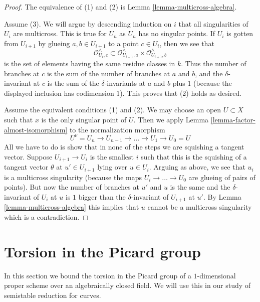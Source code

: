 \begin{proof}
The equivalence of (1) and (2) is Lemma \ref{lemma-multicross-algebra}.

\medskip\noindent
Assume (3). We will argue by descending induction on $i$ that all singularities
of $U_i$ are multicross. This is true for $U_n$ as $U_n$ has no singular points.
If $U_i$ is gotten from $U_{i + 1}$ by glueing $a, b \in U_{i + 1}$
to a point $c \in U_i$, then we see that
$$
\mathcal{O}_{U_i, c}^\wedge \subset
\mathcal{O}_{U_{i + 1}, a}^\wedge \times \mathcal{O}_{U_{i + 1}, b}^\wedge
$$
is the set of elements having the same residue classes in $k$.
Thus the number of branches at $c$ is the sum of the number of
branches at $a$ and $b$, and the $\delta$-invariant at $c$
is the sum of the $\delta$-invariants at $a$ and $b$ plus $1$
(because the displayed inclusion has codimension $1$).
This proves that (2) holds as desired.

\medskip\noindent
Assume the equivalent conditions (1) and (2). We may choose an open
$U \subset X$ such that $x$ is the only singular point of $U$.
Then we apply Lemma \ref{lemma-factor-almost-isomorphism} to
the normalization morphism
$$
U^\nu = U_n \to U_{n - 1} \to \ldots \to U_1 \to U_0 = U
$$
All we have to do is show that in none of the steps we are
squishing a tangent vector. Suppose $U_{i + 1} \to U_i$ is the
smallest $i$ such that this is the squishing of a tangent
vector $\theta$ at $u' \in U_{i + 1}$ lying over $u \in U_i$.
Arguing as above, we see that $u_i$ is a multicross singularity
(because the maps $U_i \to \ldots \to U_0$ are glueing of
pairs of points). But now the number of branches at $u'$ and $u$
is the same and the $\delta$-invariant of $U_i$ at $u$
is $1$ bigger than the $\delta$-invariant of $U_{i + 1}$ at $u'$.
By Lemma \ref{lemma-multicross-algebra}
this implies that $u$ cannot be a multicross singularity which
is a contradiction.
\end{proof}





\section{Torsion in the Picard group}
\label{section-torsion-in-pic}

\noindent
In this section we bound the torsion in the Picard group of a $1$-dimensional
proper scheme over an algebraically closed field. We will use this in our
study of semistable reduction for curves.

